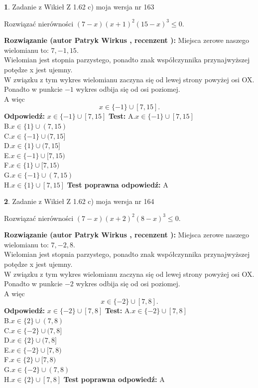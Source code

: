 \documentclass[12pt, a4paper]{article}
\theoremstyle{definition} %
\newtheorem{zad}{}
\newcommand{\zadStart}[1]{\begin{zad}#1\newline}
\newcommand{\zadStop}{\end{zad}}
\newcommand{\rozwStart}[2]{\noindent \textbf{Rozwiązanie (autor #1 , recenzent #2): }\newline}
\newcommand{\rozwStop}{\newline}
\newcommand{\odpStart}{\noindent \textbf{Odpowiedź:}\newline}
\newcommand{\odpStop}{\newline}
\newcommand{\testStart}{\noindent \textbf{Test:}\newline}
\newcommand{\testStop}{\newline}
\newcommand{\kluczStart}{\noindent \textbf{Test poprawna odpowiedź:}\newline}
\newcommand{\kluczStop}{\newline}
\begin{document}
\zadStart{Zadanie z Wikieł Z 1.62 c) moja wersja nr 163}

Rozwiązać nierówności $(7-x)(x+1)^{2}(15-x)^{3}\le0$.
\zadStop
\rozwStart{Patryk Wirkus}{}
Miejsca zerowe naszego wielomianu to: $7, -1, 15$.\\
Wielomian jest stopnia parzystego, ponadto znak współczynnika przy\linebreak najwyższej potędze x jest ujemny.\\ W związku z tym wykres wielomianu zaczyna się od lewej strony powyżej osi OX.\\
Ponadto w punkcie $-1$ wykres odbija się od osi poziomej.\\
A więc $$x \in \{-1\} \cup [7,15].$$
\rozwStop
\odpStart
$x \in \{-1\} \cup [7,15]$
\odpStop
\testStart
A.$x \in \{-1\} \cup [7,15]$\\
B.$x \in \{1\} \cup (7,15)$\\
C.$x \in \{-1\} \cup (7,15]$\\
D.$x \in \{1\} \cup (7,15]$\\
E.$x \in \{-1\} \cup [7,15)$\\
F.$x \in \{1\} \cup [7,15)$\\
G.$x \in \{-1\} \cup (7,15)$\\
H.$x \in \{1\} \cup [7,15]$
\testStop
\kluczStart
A
\kluczStop



\zadStart{Zadanie z Wikieł Z 1.62 c) moja wersja nr 164}

Rozwiązać nierówności $(7-x)(x+2)^{2}(8-x)^{3}\le0$.
\zadStop
\rozwStart{Patryk Wirkus}{}
Miejsca zerowe naszego wielomianu to: $7, -2, 8$.\\
Wielomian jest stopnia parzystego, ponadto znak współczynnika przy\linebreak najwyższej potędze x jest ujemny.\\ W związku z tym wykres wielomianu zaczyna się od lewej strony powyżej osi OX.\\
Ponadto w punkcie $-2$ wykres odbija się od osi poziomej.\\
A więc $$x \in \{-2\} \cup [7,8].$$
\rozwStop
\odpStart
$x \in \{-2\} \cup [7,8]$
\odpStop
\testStart
A.$x \in \{-2\} \cup [7,8]$\\
B.$x \in \{2\} \cup (7,8)$\\
C.$x \in \{-2\} \cup (7,8]$\\
D.$x \in \{2\} \cup (7,8]$\\
E.$x \in \{-2\} \cup [7,8)$\\
F.$x \in \{2\} \cup [7,8)$\\
G.$x \in \{-2\} \cup (7,8)$\\
H.$x \in \{2\} \cup [7,8]$
\testStop
\kluczStart
A
\kluczStop
\end{document}
